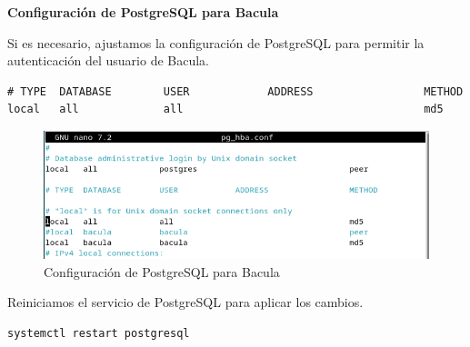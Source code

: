 \textbf{Configuración de PostgreSQL para Bacula}\medskip

Si es necesario, ajustamos la configuración de PostgreSQL para permitir la autenticación del usuario de Bacula.
\begin{verbatim}
# TYPE  DATABASE        USER            ADDRESS                 METHOD
local   all             all                                     md5
\end{verbatim}

\begin{figure}[H]
    \centering
    \includegraphics[width=0.5\linewidth]{instalacionBacula/md5postgesql.png}
    \caption{Configuración de PostgreSQL para Bacula}
\end{figure}

Reiniciamos el servicio de PostgreSQL para aplicar los cambios.
\begin{verbatim}
systemctl restart postgresql
\end{verbatim}
